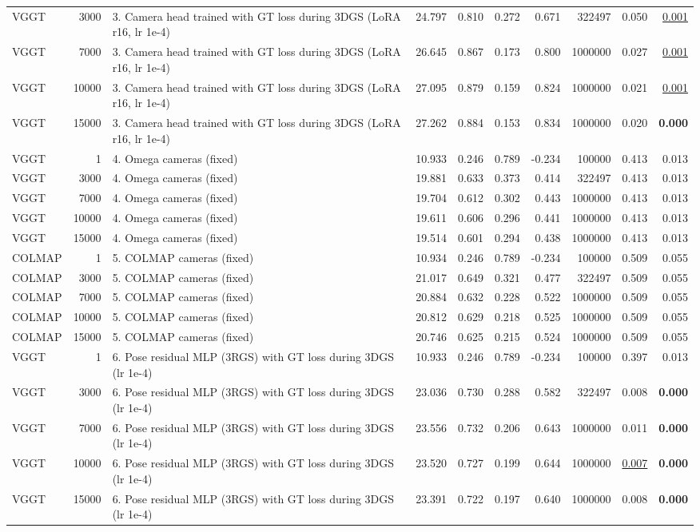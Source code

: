 \begin{table}[H]
\begin{tabular}{lrlrrrrrrr}
VGGT & 3000 & 3. Camera head trained with GT loss during 3DGS (LoRA r16, lr 1e-4) & 24.797 & 0.810 & 0.272 & 0.671 & 322497 & 0.050 & \underline{0.001} \\
VGGT & 7000 & 3. Camera head trained with GT loss during 3DGS (LoRA r16, lr 1e-4) & 26.645 & 0.867 & 0.173 & 0.800 & 1000000 & 0.027 & \underline{0.001} \\
VGGT & 10000 & 3. Camera head trained with GT loss during 3DGS (LoRA r16, lr 1e-4) & 27.095 & 0.879 & 0.159 & 0.824 & 1000000 & 0.021 & \underline{0.001} \\
VGGT & 15000 & 3. Camera head trained with GT loss during 3DGS (LoRA r16, lr 1e-4) & 27.262 & 0.884 & 0.153 & 0.834 & 1000000 & 0.020 & \textbf{0.000} \\
VGGT & 1 & 4. Omega cameras (fixed) & 10.933 & 0.246 & 0.789 & -0.234 & 100000 & 0.413 & 0.013 \\
VGGT & 3000 & 4. Omega cameras (fixed) & 19.881 & 0.633 & 0.373 & 0.414 & 322497 & 0.413 & 0.013 \\
VGGT & 7000 & 4. Omega cameras (fixed) & 19.704 & 0.612 & 0.302 & 0.443 & 1000000 & 0.413 & 0.013 \\
VGGT & 10000 & 4. Omega cameras (fixed) & 19.611 & 0.606 & 0.296 & 0.441 & 1000000 & 0.413 & 0.013 \\
VGGT & 15000 & 4. Omega cameras (fixed) & 19.514 & 0.601 & 0.294 & 0.438 & 1000000 & 0.413 & 0.013 \\
COLMAP & 1 & 5. COLMAP cameras (fixed) & 10.934 & 0.246 & 0.789 & -0.234 & 100000 & 0.509 & 0.055 \\
COLMAP & 3000 & 5. COLMAP cameras (fixed) & 21.017 & 0.649 & 0.321 & 0.477 & 322497 & 0.509 & 0.055 \\
COLMAP & 7000 & 5. COLMAP cameras (fixed) & 20.884 & 0.632 & 0.228 & 0.522 & 1000000 & 0.509 & 0.055 \\
COLMAP & 10000 & 5. COLMAP cameras (fixed) & 20.812 & 0.629 & 0.218 & 0.525 & 1000000 & 0.509 & 0.055 \\
COLMAP & 15000 & 5. COLMAP cameras (fixed) & 20.746 & 0.625 & 0.215 & 0.524 & 1000000 & 0.509 & 0.055 \\
VGGT & 1 & 6. Pose residual MLP (3RGS) with GT loss during 3DGS (lr 1e-4) & 10.933 & 0.246 & 0.789 & -0.234 & 100000 & 0.397 & 0.013 \\
VGGT & 3000 & 6. Pose residual MLP (3RGS) with GT loss during 3DGS (lr 1e-4) & 23.036 & 0.730 & 0.288 & 0.582 & 322497 & 0.008 & \textbf{0.000} \\
VGGT & 7000 & 6. Pose residual MLP (3RGS) with GT loss during 3DGS (lr 1e-4) & 23.556 & 0.732 & 0.206 & 0.643 & 1000000 & 0.011 & \textbf{0.000} \\
VGGT & 10000 & 6. Pose residual MLP (3RGS) with GT loss during 3DGS (lr 1e-4) & 23.520 & 0.727 & 0.199 & 0.644 & 1000000 & \underline{0.007} & \textbf{0.000} \\
VGGT & 15000 & 6. Pose residual MLP (3RGS) with GT loss during 3DGS (lr 1e-4) & 23.391 & 0.722 & 0.197 & 0.640 & 1000000 & 0.008 & \textbf{0.000} \\
\bottomrule
\end{tabular}
\end{table}